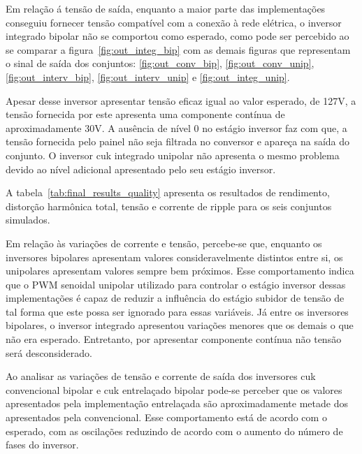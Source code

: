 \documentclass[
	12pt,				%
	openany,
	onseside,
	a4paper,			%
	english,			%
	french,				%
	spanish,			%
	brazil,				%
	]{abntex2}
\begin{document}
Em relação á tensão de saída, enquanto a maior parte das implementações conseguiu fornecer tensão compatível com a conexão à rede elétrica, o inversor integrado bipolar não se comportou como esperado, como pode ser percebido ao se comparar a figura~\ref{fig:out_integ_bip} com as demais figuras que representam o sinal de saída dos conjuntos: \ref{fig:out_conv_bip}, \ref{fig:out_conv_unip}, \ref{fig:out_interv_bip}, \ref{fig:out_interv_unip} e \ref{fig:out_integ_unip}.

Apesar desse inversor apresentar tensão eficaz igual ao valor esperado, de 127V, a tensão fornecida por este apresenta uma componente contínua de aproximadamente 30V. A ausência de nível 0 no estágio inversor faz com que, a tensão fornecida pelo painel não seja filtrada no conversor e apareça na saída do conjunto. O inversor cuk integrado unipolar não apresenta o mesmo problema devido ao nível adicional apresentado pelo seu estágio inversor.

A tabela~\ref{tab:final_results_quality} apresenta os resultados de rendimento, distorção harmônica total, tensão e corrente de ripple para os seis conjuntos simulados.

Em relação às variações de corrente e tensão, percebe-se que, enquanto os inversores bipolares apresentam valores consideravelmente distintos entre si, os unipolares apresentam valores sempre bem próximos. Esse comportamento indica que o PWM senoidal unipolar utilizado para controlar o estágio inversor dessas implementações é capaz de reduzir a influência do estágio subidor de tensão de tal forma que este possa ser ignorado para essas variáveis. Já entre os inversores bipolares, o inversor integrado apresentou variações menores que os demais o que não era esperado. Entretanto, por apresentar componente contínua não tensão será desconsiderado.

Ao analisar as variações de tensão e corrente de saída dos inversores cuk convencional bipolar e cuk entrelaçado bipolar pode-se perceber que os valores apresentados pela implementação entrelaçada são aproximadamente metade dos apresentados pela convencional. Esse comportamento está de acordo com o esperado, com as oscilações reduzindo de acordo com o aumento do número de fases do inversor.
\end{document}
